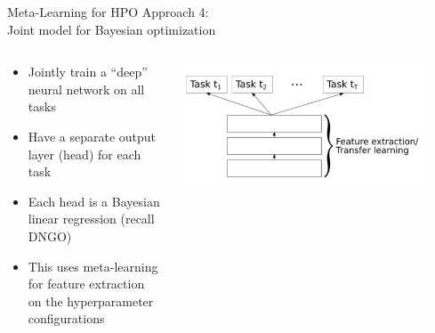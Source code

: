 \begin{frame}[c]{Meta-Learning for HPO Approach 4:\\ Joint model for Bayesian optimization}

\begin{columns}[T] %
\begin{column}{.38\textwidth}

\begin{itemize}
    \item<1-> \alert{Jointly train} a ``deep'' neural network \alert{on all tasks} 
    \item<2-> Have a separate output layer (head) for each task 
    \item<3-> Each head is a Bayesian linear regression (recall DNGO)
    \item<4-> This uses meta-learning for feature extraction on the hyperparameter configurations 
\end{itemize}
\end{column}%

\hfill%

\begin{column}{.58\textwidth}
\includegraphics[width=0.9\textwidth]{../w07_hpo_speedup/images/meta_learning/perrone_int.jpg}
\end{column}%
\end{columns}

\hspace{12cm}

\end{frame}
%
%

